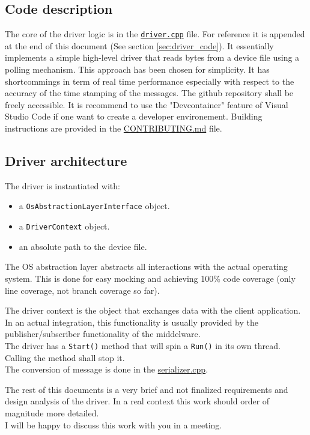 \subsection{Code description}
The core of the driver logic is in the \href{https://github.com/renn0xtek9/assignment/blob/master/flight_software/libs/embedded_software/uart_imu_driver/src/driver.cpp}{\texttt{driver.cpp}} file.
For reference it is appended at the end of this document (See section \ref{sec:driver_code}).
It essentially implements a simple high-level driver that reads bytes from a device file using a polling mechanism.
This approach has been chosen for simplicity.
It has shortcommings in term of real time performance especially with respect to the accuracy of the time stamping of the messages.
The github repository shall be freely accessible. It is recommend to use the "Devcontainer" feature of Visual Studio Code if one want to create a developer environement.
Building instructions are provided in the \href{https://github.com/renn0xtek9/assignment/blob/master/CONTRIBUTING.md}{CONTRIBUTING.md} file.

\subsection{Driver architecture}
The driver is instantiated with:
\begin{itemize}
    \item a \texttt{OsAbstractionLayerInterface} object.
    \item a \texttt{DriverContext} object.
    \item an absolute path to the device file.
\end{itemize}

The OS abstraction layer abstracts all interactions with the actual operating system.
This is done for easy mocking and achieving 100\% code coverage (only line coverage, not branch coverage so far).

The driver context is the object that exchanges data with the client application.
In an actual integration, this functionality is usually provided by the publisher/subscriber functionality of the middelware.\\
The driver has a \texttt{Start()} method that will spin a \texttt{Run()} in its own thread.
Calling the  method shall stop it.\\
The conversion of message is done in the \href{https://github.com/renn0xtek9/assignment/blob/master/flight_software/libs/embedded_software/serializer/src/serializer.cpp}{serializer.cpp}.

The rest of this documents is a very brief and not finalized requirements and design analysis of the driver.
In a real context this work should order of magnitude more detailed.\\
I will be happy to discuss this work with you in a meeting.
